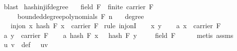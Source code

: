 \begin{isabellebody}
\ blast%
\endisatagproof
{\isafoldproof}%
%
\isadelimproof
\isanewline
%
\endisadelimproof
\isanewline
{}\isamarkupfalse%
\ hash{\isacharunderscore}{\kern0pt}inj{\isacharunderscore}{\kern0pt}if{\isacharunderscore}{\kern0pt}degree{\isacharunderscore}{\kern0pt}{}{\isacharcolon}{\kern0pt}\isanewline
\ \ \ {\isachardoublequoteopen}field\ F\ {\isasymand}\ finite\ {\isacharparenleft}{\kern0pt}carrier\ F{\isacharparenright}{\kern0pt}{\isachardoublequoteclose}\isanewline
\ \ \ {\isachardoublequoteopen}{\isasymomega}\ {\isasymin}\ bounded{\isacharunderscore}{\kern0pt}degree{\isacharunderscore}{\kern0pt}polynomials\ F\ n{\isachardoublequoteclose}\isanewline
\ \ \ {\isachardoublequoteopen}degree\ {\isasymomega}\ {\isacharequal}{\kern0pt}\ {}{\isachardoublequoteclose}\isanewline
\ \ \ {\isachardoublequoteopen}inj{\isacharunderscore}{\kern0pt}on\ {\isacharparenleft}{\kern0pt}{\isasymlambda}x{\isachardot}{\kern0pt}\ hash\ F\ x\ {\isasymomega}{\isacharparenright}{\kern0pt}\ {\isacharparenleft}{\kern0pt}carrier\ F{\isacharparenright}{\kern0pt}{\isachardoublequoteclose}\isanewline
%
\isadelimproof
%
\endisadelimproof
%
\isatagproof
{}\isamarkupfalse%
\ {\isacharparenleft}{\kern0pt}rule\ inj{\isacharunderscore}{\kern0pt}onI{\isacharparenright}{\kern0pt}\isanewline
\ \ \isamarkupfalse%
\ x\ y\isanewline
\ \ \isamarkupfalse%
\ a{}{\isacharcolon}{\kern0pt}\ {\isachardoublequoteopen}x\ {\isasymin}\ carrier\ F{\isachardoublequoteclose}\isanewline
\ \ \isamarkupfalse%
\ a{}{\isacharcolon}{\kern0pt}\ {\isachardoublequoteopen}y\ {\isasymin}\ carrier\ F{\isachardoublequoteclose}\isanewline
\ \ \isamarkupfalse%
\ a{}{\isacharcolon}{\kern0pt}\ {\isachardoublequoteopen}hash\ F\ x\ {\isasymomega}\ {\isacharequal}{\kern0pt}\ hash\ F\ y\ {\isasymomega}{\isachardoublequoteclose}\isanewline
\isanewline
\ \ \isamarkupfalse%
\ field\ F\isanewline
\ \ \ \ \isamarkupfalse%
\ {\isacharparenleft}{\kern0pt}metis\ assms{\isacharparenleft}{\kern0pt}{}{\isacharparenright}{\kern0pt}{\isacharparenright}{\kern0pt}\isanewline
\isanewline
\ \ \isamarkupfalse%
\ u\ v\ \ {\isasymomega}{\isacharunderscore}{\kern0pt}def{\isacharcolon}{\kern0pt}\ {\isachardoublequoteopen}{\isasymomega}\ {\isacharequal}{\kern0pt}\ {\isacharbrackleft}{\kern0pt}u{\isacharcomma}{\kern0pt}v{\isacharbrackright}{\kern0pt}{\isachardoublequoteclose}\ \isamarkupfalse%

\end{isabellebody}
